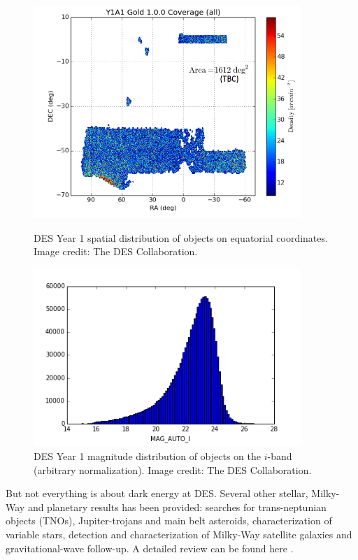 \begin{figure}
\begin{center}
\includegraphics[width=0.9\textwidth]{./Pictures/des_y1_coverage.png}
\caption{DES Year 1 spatial distribution of objects on equatorial coordinates. Image credit: The DES Collaboration.}
\label{fig:des_y1_coverage}

\includegraphics[width=0.9\textwidth]{./Pictures/des_y1_mag_auto_i.png}
\caption{DES Year 1 magnitude distribution of objects on the $i$-band (arbitrary normalization). Image credit: The DES Collaboration.}
\label{fig:des_y1_mag_auto_i}
\end{center}
\end{figure}
\newline

But not everything is about dark energy at DES. Several other stellar, Milky-Way and planetary results has been provided: searches for trans-neptunian objects (TNOs), Jupiter-trojans and main belt asteroids, characterization of variable stars, detection and characterization of Milky-Way satellite galaxies and gravitational-wave follow-up. A detailed review can be found here \cite{2016MNRAS.460.1270D}.